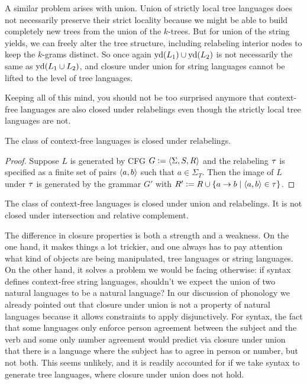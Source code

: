 A similar problem arises with union.
Union of strictly local tree languages does not necessarily preserve their strict locality because we might be able to build completely new trees from the union of the $k$-trees.
But for union of the string yields, we can freely alter the tree structure, including relabeling interior nodes to keep the $k$-grams distinct.
So once again $\mathrm{yd}(L_1) \cup \mathrm{yd}(L_2)$ is not necessarily the same as $\mathrm{yd}(L_1 \cup L_2)$, and closure under union for string languages cannot be lifted to the level of tree languages.

Keeping all of this mind, you should not be too surprised anymore that context-free languages are also closed under relabelings even though the strictly local tree languages are not.
%
\begin{lemma}
    The class of context-free languages is closed under relabelings.
\end{lemma}
%
\begin{proof}
    Suppose $L$ is generated by CFG $G \mathrel{\mathop:}= \left \langle \Sigma,S,R \right \rangle  $ and the relabeling $\tau$ is specified as a finite set of pairs $\left \langle a,b \right \rangle $ such that $a \in \Sigma_T$.
    Then the image of $L$ under $\tau$ is generated by the grammar $G'$ with $R' \mathrel{\mathop:}= R \cup \left \{  a \rightarrow b \mid \left \langle a,b \right \rangle  \in \tau \right \}$.
\end{proof}

\begin{theorem}
    The class of context-free languages is closed under union and relabelings.
    It is not closed under intersection and relative complement.
\end{theorem}

The difference in closure properties is both a strength and a weakness.
On the one hand, it makes things a lot trickier, and one always has to pay attention what kind of objects are being manipulated, tree languages or string languages.
On the other hand, it solves a problem we would be facing otherwise: if syntax defines context-free string languages, shouldn't we expect the union of two natural languages to be a natural language?
In our discussion of phonology we already pointed out that closure under union is not a property of natural languages because it allows constraints to apply disjunctively.
For syntax, the fact that some languages only enforce person agreement between the subject and the verb and some only number agreement would predict via closure under union that there is a language where the subject has to agree in person or number, but not both.
This seems unlikely, and it is readily accounted for if we take syntax to generate tree languages, where closure under union does not hold.

